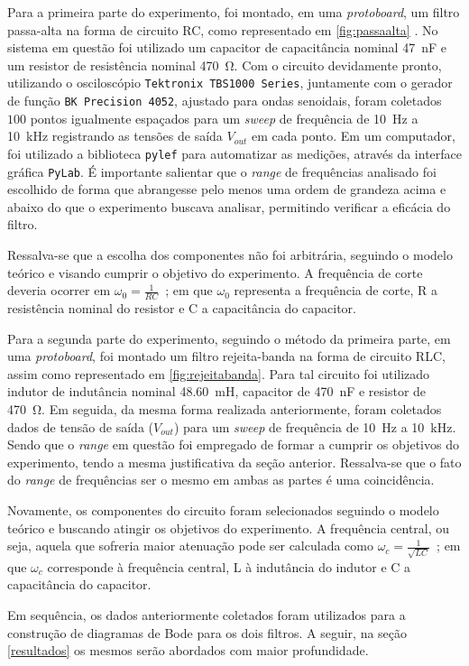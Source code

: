 Para a primeira parte do experimento, foi montado, em uma \textit{protoboard}, um filtro passa-alta na forma de  circuito RC, como representado em \cref{fig:passaalta} . No sistema em questão foi utilizado um capacitor de capacitância nominal \SI{47}{\nano\farad} e um resistor de resistência nominal \SI{470}{\ohm}. Com o circuito devidamente pronto, utilizando o osciloscópio \texttt{Tektronix TBS1000 Series}\cite{ref:osciloscopio}, juntamente com o gerador de função \texttt{BK Precision 4052}\cite{ref:gerador}, ajustado para ondas senoidais, foram coletados $100$ pontos igualmente espaçados para um \textit{sweep} de frequência de \SI{10}{\hertz} a \SI{10}{\kilo\hertz} registrando as tensões de saída $V_{out}$ em cada ponto. Em um computador, foi utilizado a biblioteca \texttt{pylef}\cite{ref:pylef} para automatizar as medições, através da interface gráfica \texttt{PyLab}. É importante salientar que o \textit{range} de frequências analisado foi escolhido de forma que abrangesse pelo menos uma ordem de grandeza acima e abaixo do que o experimento buscava analisar, permitindo verificar a eficácia do filtro.

Ressalva-se que a escolha dos componentes não foi arbitrária, seguindo o modelo teórico e visando cumprir o objetivo do experimento. A frequência de corte deveria ocorrer em $\omega_0=\frac{1}{RC}$~\cite{ref:circuitos}; em que $\omega_0$ representa a frequência de corte, R a resistência nominal do resistor e C a capacitância do capacitor.

Para a segunda parte do experimento, seguindo o método da primeira parte, em uma \textit{protoboard}, foi montado um filtro rejeita-banda na forma de circuito RLC, assim como representado em \ref{fig:rejeitabanda}. Para tal circuito foi utilizado indutor de indutância nominal \SI{48,60}{\milli\henry}, capacitor de \SI{470}{\nano\farad} e resistor de \SI{470}{\ohm}. Em seguida, da mesma forma realizada anteriormente, foram coletados dados de tensão de saída ($V_{out}$) para um \textit{sweep} de frequência de \SI{10}{\hertz} a \SI{10}{\kilo\hertz}. Sendo que o \textit{range} em questão foi empregado de formar a cumprir os objetivos do experimento, tendo a mesma justificativa da seção anterior. Ressalva-se que o fato do \textit{range} de frequências ser o mesmo em ambas as partes é uma coincidência.

Novamente, os componentes do circuito foram selecionados seguindo o modelo teórico e buscando atingir os objetivos do experimento. A frequência central, ou seja, aquela que sofreria maior atenuação pode ser calculada como $\omega_c=\frac{1}{\sqrt{LC}}$~\cite{ref:circuitos}; em que $\omega_c$ corresponde à frequência central, L à indutância do indutor e C a capacitância do capacitor.

Em sequência, os dados anteriormente coletados foram utilizados para a construção de diagramas de Bode para os dois filtros. A seguir, na seção \ref{resultados} os mesmos serão abordados com maior profundidade.

